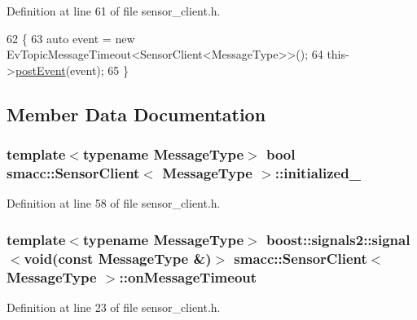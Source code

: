 Definition at line 61 of file sensor\+\_\+client.\+h.


\begin{DoxyCode}
62   \{
63     \textcolor{keyword}{auto} \textcolor{keyword}{event} = \textcolor{keyword}{new} EvTopicMessageTimeout<SensorClient<MessageType>>();
64     this->\hyperlink{classsmacc_1_1ISmaccComponent_a687dead5b87a3b9781b9bf6ab0b7afa5}{postEvent}(event);
65   \}
\end{DoxyCode}


\subsection{Member Data Documentation}
\subsubsection[{\texorpdfstring{initialized\+\_\+}{initialized_}}]{\setlength{\rightskip}{0pt plus 5cm}template$<$typename Message\+Type$>$ {\bf bool} {\bf smacc\+::\+Sensor\+Client}$<$ Message\+Type $>$\+::initialized\+\_\+\hspace{0.3cm}{\ttfamily [private]}}\hypertarget{classsmacc_1_1SensorClient_a7dde11291a16f6c2edaa02552895ee9e}{}\label{classsmacc_1_1SensorClient_a7dde11291a16f6c2edaa02552895ee9e}


Definition at line 58 of file sensor\+\_\+client.\+h.

\subsubsection[{\texorpdfstring{on\+Message\+Timeout}{onMessageTimeout}}]{\setlength{\rightskip}{0pt plus 5cm}template$<$typename Message\+Type$>$ boost\+::signals2\+::signal$<$void(const Message\+Type \&)$>$ {\bf smacc\+::\+Sensor\+Client}$<$ Message\+Type $>$\+::on\+Message\+Timeout}\hypertarget{classsmacc_1_1SensorClient_a3652c00d16a1a82ef6b43466ef360c72}{}\label{classsmacc_1_1SensorClient_a3652c00d16a1a82ef6b43466ef360c72}


Definition at line 23 of file sensor\+\_\+client.\+h.



